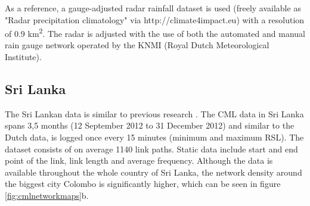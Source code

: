 \documentclass[twocolumn, 10pt, a4paper]{article}
\begin{document}
	As a reference, a gauge-adjusted radar rainfall dataset is used (freely available as "Radar precipitation climatology" via http://climate4impact.eu) with a resolution of 0.9 km\textsuperscript{2}. The radar is adjusted with the use of both the automated and  manual rain gauge network operated by the KNMI (Royal Dutch Meteorological Institute).
	
	
	\subsection{Sri Lanka}
	The Sri Lankan data is similar to previous research \cite{Overeem2021}.
	The CML data in Sri Lanka spans 3,5 months (12 September 2012 to 31 December 2012) and similar to the Dutch data, is logged once every 15 minutes (minimum and maximum RSL). The dataset consists of on average 1140 link paths. Static data include start and end point of the link, link length and average frequency. Although the data is available throughout the whole country of Sri Lanka, the network density around the biggest city Colombo is significantly higher, which can be seen in figure \ref{fig:cmlnetworkmaps}b.
	
	
	
\end{document}
